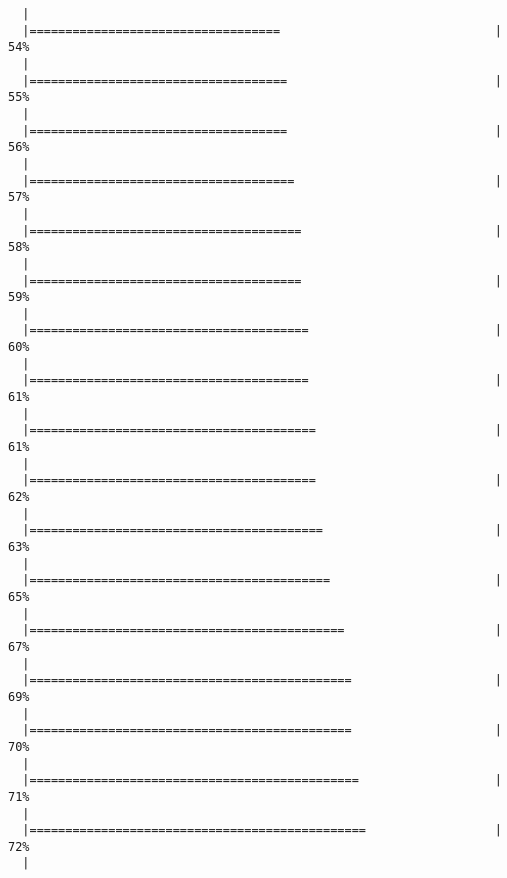 \documentclass[]{article}
\begin{document}
\begin{verbatim}
  |                                                                       
  |===================================                              |  54%
  |                                                                       
  |====================================                             |  55%
  |                                                                       
  |====================================                             |  56%
  |                                                                       
  |=====================================                            |  57%
  |                                                                       
  |======================================                           |  58%
  |                                                                       
  |======================================                           |  59%
  |                                                                       
  |=======================================                          |  60%
  |                                                                       
  |=======================================                          |  61%
  |                                                                       
  |========================================                         |  61%
  |                                                                       
  |========================================                         |  62%
  |                                                                       
  |=========================================                        |  63%
  |                                                                       
  |==========================================                       |  65%
  |                                                                       
  |============================================                     |  67%
  |                                                                       
  |=============================================                    |  69%
  |                                                                       
  |=============================================                    |  70%
  |                                                                       
  |==============================================                   |  71%
  |                                                                       
  |===============================================                  |  72%
  |                                                                       

\end{verbatim}
\end{document}
